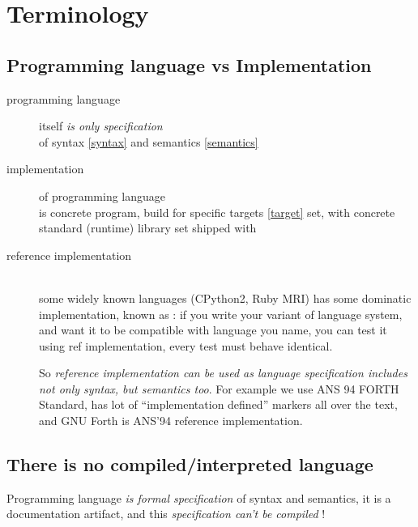 \chapter{Terminology}\label{terminology}\clearpage

\section{Programming language vs Implementation}\label{implementing}

\begin{description}
\item[programming language] itself \emph{is only specification}\ \\
of syntax \ref{syntax} and semantics \ref{semantics}
\item[implementation] of programming language\ \\
is concrete program, build for specific targets \ref{target} set, with concrete
standard (runtime) library set shipped with
\item[reference implementation]\ \\
some widely known languages (CPython2, Ruby MRI) has some dominatic
implementation, known as :
if you write your variant of language system, and want it to be compatible with
language you name, you can test it using ref implementation, every test must
behave identical.

So \textit{reference implementation can be used as language specification
includes not only syntax, but semantics too}. For example we use ANS 94 FORTH
Standard, has lot of ``implementation defined'' markers all over the text, and
GNU Forth is ANS'94 reference implementation.

\end{description}

\section{There is no compiled/interpreted language}

Programming language \emph{is formal specification} of syntax and semantics,
it is a documentation artifact, and this \emph{specification can't be
compiled} !

